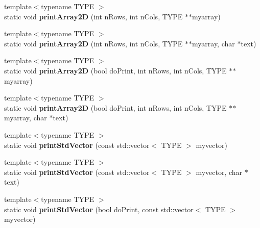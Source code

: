 \begin{DoxyCompactItemize}
\item 
\hypertarget{class_k_w_util_a0d00bcaaee4bf9fe1ea3f28c39db766d}{{\footnotesize template$<$typename T\-Y\-P\-E $>$ }\\static void {\bfseries print\-Array2\-D} (int n\-Rows, int n\-Cols, T\-Y\-P\-E $\ast$$\ast$myarray)}\label{class_k_w_util_a0d00bcaaee4bf9fe1ea3f28c39db766d}

\item 
\hypertarget{class_k_w_util_a8ca8f9d0826b637aee5285af196431a0}{{\footnotesize template$<$typename T\-Y\-P\-E $>$ }\\static void {\bfseries print\-Array2\-D} (int n\-Rows, int n\-Cols, T\-Y\-P\-E $\ast$$\ast$myarray, char $\ast$text)}\label{class_k_w_util_a8ca8f9d0826b637aee5285af196431a0}

\item 
\hypertarget{class_k_w_util_a2907060d81976090c40829107159666d}{{\footnotesize template$<$typename T\-Y\-P\-E $>$ }\\static void {\bfseries print\-Array2\-D} (bool do\-Print, int n\-Rows, int n\-Cols, T\-Y\-P\-E $\ast$$\ast$myarray)}\label{class_k_w_util_a2907060d81976090c40829107159666d}

\item 
\hypertarget{class_k_w_util_a59aabe5a32605da8367ca84c3ad3a0ab}{{\footnotesize template$<$typename T\-Y\-P\-E $>$ }\\static void {\bfseries print\-Array2\-D} (bool do\-Print, int n\-Rows, int n\-Cols, T\-Y\-P\-E $\ast$$\ast$myarray, char $\ast$text)}\label{class_k_w_util_a59aabe5a32605da8367ca84c3ad3a0ab}

\item 
\hypertarget{class_k_w_util_aaffd937290f71df67551a6f2a00e1660}{{\footnotesize template$<$typename T\-Y\-P\-E $>$ }\\static void {\bfseries print\-Std\-Vector} (const std\-::vector$<$ T\-Y\-P\-E $>$ myvector)}\label{class_k_w_util_aaffd937290f71df67551a6f2a00e1660}

\item 
\hypertarget{class_k_w_util_a8d69c11c8b97c2bc5aee5449ece9b11d}{{\footnotesize template$<$typename T\-Y\-P\-E $>$ }\\static void {\bfseries print\-Std\-Vector} (const std\-::vector$<$ T\-Y\-P\-E $>$ myvector, char $\ast$text)}\label{class_k_w_util_a8d69c11c8b97c2bc5aee5449ece9b11d}

\item 
\hypertarget{class_k_w_util_a684d6abf0326e8d495f709c2b1d82ea2}{{\footnotesize template$<$typename T\-Y\-P\-E $>$ }\\static void {\bfseries print\-Std\-Vector} (bool do\-Print, const std\-::vector$<$ T\-Y\-P\-E $>$ myvector)}\label{class_k_w_util_a684d6abf0326e8d495f709c2b1d82ea2}


\end{DoxyCompactItemize}
